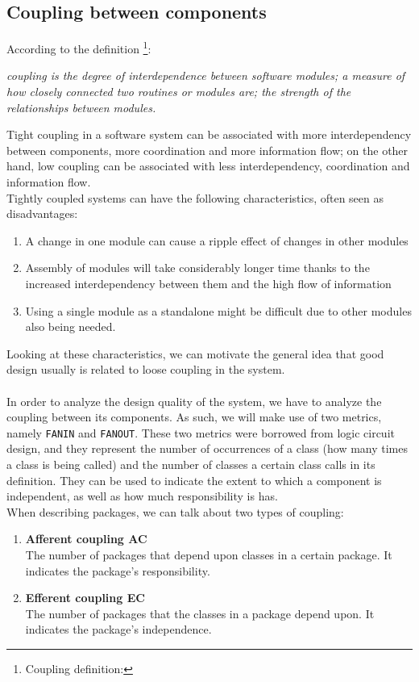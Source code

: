 \subsection{Coupling between components}
            According to the definition
            \footnote{Coupling definition: }:
            \begin{adjustwidth}{1.5cm}{}
                \textit{coupling is the degree of interdependence between software modules; a measure of how closely connected two routines or modules are; the strength of the relationships between modules.}
            \end{adjustwidth}
            Tight coupling in a software system can be associated with more interdependency between components, more coordination and more information flow; on the other hand, low coupling can be associated with less interdependency, coordination and information flow. \\
            Tightly coupled systems can have the following characteristics, often seen as disadvantages:
            \begin{enumerate}
                \item A change in one module can cause a ripple effect of changes in other modules 
                \item Assembly of modules will take considerably longer time thanks to the increased interdependency between them and the high flow of information
                \item Using a single module as a standalone might be difficult due to other modules also being needed.
            \end{enumerate}
            Looking at these characteristics, we can motivate the general idea that good design usually is related to loose coupling in the system.\\\\
            In order to analyze the design quality of the system, we have to analyze the coupling between its components. As such, we will make use of two metrics, namely \texttt{FANIN} and \texttt{FANOUT}. These two metrics were borrowed from logic circuit design, and they represent the number of occurrences of a class (how many times a class is being called) and the number of classes a certain class calls in its definition. They can be used to indicate the extent to which a component is independent, as well as how much responsibility is has.\\
            When describing packages, we can talk about two types of coupling:
            \begin{enumerate}
                \item \textbf{Afferent coupling AC}\\
                The number of packages that depend upon classes in a certain package. It indicates the package's responsibility.
                \item \textbf{Efferent coupling EC}\\
                The number of packages that the classes in a package depend upon. It indicates the package's independence.
            \end{enumerate}